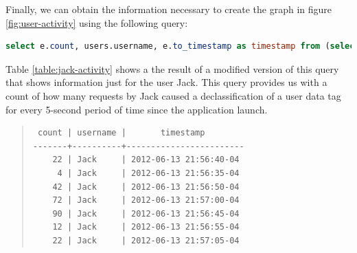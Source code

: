 Finally, we can obtain the information necessary to create the graph in figure \ref{fig:user-activity} using the following query:

\begin{lstlisting}[language=SQL, deletendkeywords={TIMESTAMP}, label=code:query-accesses]
select e.count, users.username, e.to_timestamp as timestamp from (select count(*), tags_modified, (to_timestamp(((extract (epoch from events.timestamp)/5)::int)*5)) from events tags_modified in (select tag from users) group by (to_timestamp(((extract (epoch from events.timestamp)/5)::int)*5)), tags_modified) as e inner join users on e.tags_modified=users.tag
\end{lstlisting}

Table \ref{table:jack-activity} shows a the result of a modified version of this query that shows information just for the user Jack. This query provides us with a count of how many requests by Jack caused a declassification of a user data tag for every 5-second period of time since the application launch.

\begin{table}
\begin{quote}
\begin{verbatim}
 count | username |       timestamp        
-------+----------+------------------------
    22 | Jack     | 2012-06-13 21:56:40-04
     4 | Jack     | 2012-06-13 21:56:35-04
    42 | Jack     | 2012-06-13 21:56:50-04
    72 | Jack     | 2012-06-13 21:57:00-04
    90 | Jack     | 2012-06-13 21:56:45-04
    12 | Jack     | 2012-06-13 21:56:55-04
    22 | Jack     | 2012-06-13 21:57:05-04
\end{verbatim}
\end{quote}
\caption*{Account activity for user Jack}
\caption[Mint Account activity for user Jack]{This table shows the number of declassifies done by Jack's principal in each five-second period since the application launched. The \emph{count} denotes such number. The \emph{username} column denotes the user who's data tag is in question. The \emph{timestamp} column denotes the start of the 5-second period. A table containing similar information for all users would be a precursor to producing the graph in figure \ref{fig:user-activity}, but here we only show this data for user Jack for simplicity.}
\label{table:jack-activity}
\end{table}
